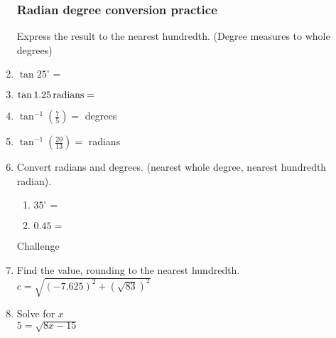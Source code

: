 \documentclass[12pt, oneside]{article}
\begin{document}
\begin{enumerate}
\subsubsection*{Radian degree conversion practice}
Express the result to the nearest hundredth. (Degree measures to whole degrees)
  \item $\displaystyle \tan 25^\circ = $ \vspace{1cm}
  \item $\displaystyle \tan 1.25 \,\rm{radians}= $ \vspace{1cm}
  \item $\displaystyle \tan^{-1} (\frac{7}{5}) = $ \hspace{2.4  cm} degrees \vspace{1cm}
  \item $\displaystyle \tan^{-1} (\frac{20}{13}) = $ \hspace{2cm} radians \vspace{1cm}
  \item Convert radians and degrees. (nearest whole degree, nearest hundredth radian).\vspace{.25cm}
  \begin{multicols}{2}
    \begin{enumerate}
      \item $35^\circ = $ \vspace{1cm}
      \item $\displaystyle 0.45 =$ \vspace{1cm}
    \end{enumerate}
  \end{multicols} \vspace{1cm}

Challenge
\item Find the value, rounding to the nearest hundredth.\\[0.25cm]
$c=\sqrt{(-7.625)^2+(\sqrt{83})^2}$
\vspace{2cm}

\item Solve for $x$\\[0.25cm]
 $5=\sqrt{8x-15}$

\end{enumerate}
\end{document}
